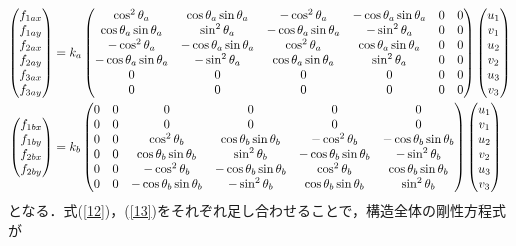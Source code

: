 \documentclass[a4paper,11pt,uplatex]{jsarticle}
\begin{document}
\begin{align}
  \label{12}
  \begin{pmatrix} f_{1ax} \\ f_{1ay} \\ f_{2ax} \\ f_{2ay} \\ f_{3ax} \\ f_{3ay} \end{pmatrix} &= k_a \begin{pmatrix} \cos^2 \theta_a & \cos \theta_a \sin \theta_a & -\cos^2 \theta_a & -\cos \theta_a \sin \theta_a &0&0 \\ \cos \theta_a \sin \theta_a & \sin^2 \theta_a & -\cos \theta_a \sin \theta_a
  & -\sin^2 \theta_a &0 &0\\ -\cos^2 \theta_a & -\cos \theta_a \sin \theta_a & \cos^2 \theta_a & \cos \theta_a \sin \theta_a &0&0\\ -\cos \theta_a \sin \theta_a & -\sin^2 \theta_a& \cos \theta_a \sin \theta_a
  & \sin^2 \theta_a &0&0 \\ 0&0&0&0&0&0 \\ 0&0&0&0&0&0 \end{pmatrix} \begin{pmatrix} u_1 \\ v_1 \\ u_2 \\ v_2 \\ u_3 \\ v_3 \end{pmatrix} \\
  \label{13}
  \begin{pmatrix} f_{1bx} \\ f_{1by} \\ f_{2bx} \\ f_{2by} \end{pmatrix} &= k_b \begin{pmatrix} 0&0&0&0&0&0 \\ 0&0&0&0&0&0 \\ 0&0& \cos^2 \theta_b & \cos \theta_b \sin \theta_b & -\cos^2 \theta_b & -\cos \theta_b \sin \theta_b \\ 0&0&\cos \theta_b \sin \theta_b & \sin^2 \theta_b & -\cos \theta_b \sin \theta_b
  & -\sin^2 \theta_b \\ 0&0&-\cos^2 \theta_b & -\cos \theta_b \sin \theta_b & \cos^2 \theta_b & \cos \theta_b \sin \theta_b \\ 0&0&-\cos \theta_b \sin \theta_b & -\sin^2 \theta_b & \cos \theta_b \sin \theta_b
  & \sin^2 \theta_b \end{pmatrix} \begin{pmatrix} u_1 \\ v_1 \\ u_2 \\ v_2 \\ u_3 \\ v_3 \end{pmatrix}
\end{align}
となる．式(\ref{12})，(\ref{13})をそれぞれ足し合わせることで，構造全体の剛性方程式が
\end{document}
